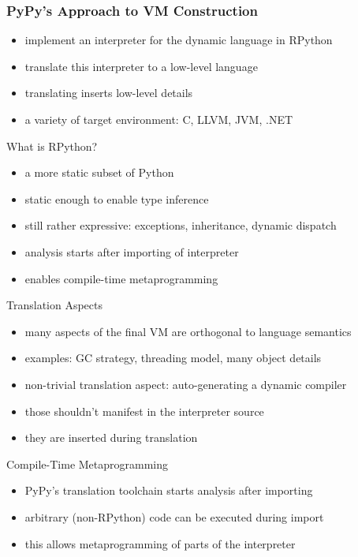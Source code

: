 \documentclass[utf8x]{beamer}
\begin{document}
\begin{frame}
    \frametitle{PyPy's Approach to VM Construction}
    \begin{itemize}
    \item implement an interpreter for the dynamic language in RPython
    \item translate this interpreter to a low-level language
    \item translating inserts low-level details
    \item a variety of target environment: C, LLVM, JVM, .NET
    \end{itemize}
    \pause
    \begin{block} {What is RPython?}
        \begin{itemize}
        \item a more static subset of Python
        \item static enough to enable type inference
        \item still rather expressive: exceptions, inheritance, dynamic dispatch
        \item analysis starts after importing of interpreter
        \item enables compile-time metaprogramming
        \end{itemize}
    \end{block}
\end{frame}

\begin{frame}
    \begin{block} {Translation Aspects}
        \begin{itemize}
        \item many aspects of the final VM are orthogonal to language semantics
        \item examples: GC strategy, threading model, many object details
        \item non-trivial translation aspect: auto-generating a dynamic compiler
        \item those shouldn't manifest in the interpreter source
        \item they are inserted during translation
        \end{itemize}
    \end{block}
    \pause
    \begin{block} {Compile-Time Metaprogramming}
        \begin{itemize}
        \item PyPy's translation toolchain starts analysis after importing
        \item arbitrary (non-RPython) code can be executed during import
        \item this allows metaprogramming of parts of the interpreter
        \end{itemize}
    \end{block}
\end{frame}
\end{document}
